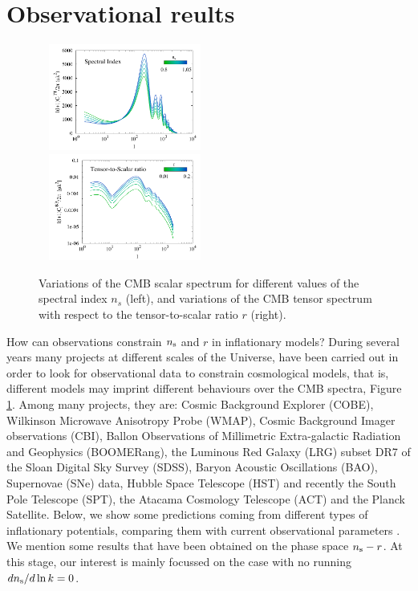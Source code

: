 \documentclass{rmaa}
\begin{document}
\section{Observational reults}

 \begin{figure}
 \begin{center}
  \includegraphics[trim = 1mm 1mm 1mm 1mm, clip, width=5.7cm, height=3.5cm]{CMB_ns.pdf}
  \includegraphics[trim = 1mm 1mm 1mm 1mm, clip, width=5.7cm, height=3.5cm]{CMB_ratio.pdf}
	\caption{Variations
	of the CMB scalar spectrum for different values of the spectral index $n_s$ (left), 
	and variations of the CMB tensor spectrum with respect to the tensor-to-scalar ratio $r$ (right).}
	\label{fig:CMB_spectra}
 \end{center}	
\end{figure}

How can observations constrain $n_{\rm s}$ and $r$ in inflationary models?
During several years many projects at different scales of the Universe, have been carried 
out in order to look for observational data to constrain cosmological models, that
is, different models may imprint different behaviours over the CMB spectra, Figure \ref{fig:CMB_spectra}.
Among many projects, they are:  
Cosmic Background Explorer (COBE), Wilkinson Microwave Anisotropy Probe (WMAP),
Cosmic Background Imager observations (CBI), Ballon Observations of Millimetric Extra-galactic 
Radiation and Geophysics (BOOMERang), the Luminous Red Galaxy (LRG) subset DR7 of the Sloan
Digital Sky Survey (SDSS), Baryon Acoustic Oscillations (BAO), Supernovae (SNe) data, 
Hubble Space Telescope (HST) and recently the South Pole Telescope (SPT), the 
Atacama Cosmology Telescope (ACT) and the Planck Satellite.
Below, we show some predictions coming from different types of inflationary potentials, 
comparing them with current observational parameters \citep{Mortonson11}.
We mention some results that have been obtained on the 
phase space $n_{\rm s}-r$. At this stage, our interest is mainly focussed 
on the case with no running $dn_{\rm s}/d\ln k =0$.
 \\
 
\end{document}
